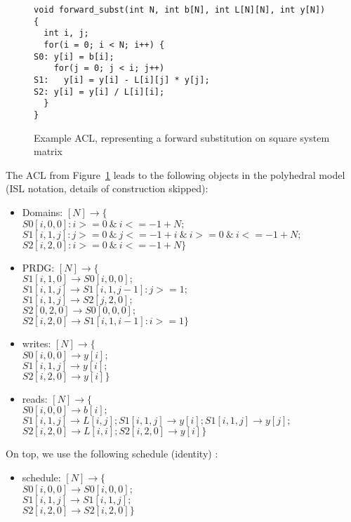 \documentclass{article}
\begin{document}
\begin{figure}[ht!]
\begin{lstlisting}
void forward_subst(int N, int b[N], int L[N][N], int y[N]) {
  int i, j;
  for(i = 0; i < N; i++) {
S0: y[i] = b[i];
    for(j = 0; j < i; j++)
S1:   y[i] = y[i] - L[i][j] * y[j];
S2: y[i] = y[i] / L[i][i];
  }
}
\end{lstlisting}
\caption{
Example ACL, representing a forward substitution on square system matrix
\label{fig:example_acl2}}
\end{figure}
The ACL from Figure~\ref{fig:example_acl2} leads to the following objects in the
polyhedral model (ISL notation, details of construction skipped):
\begin{itemize}
\item Domains: $[N] \rightarrow \{$\\ 
 $S0[i,0,0] : i >= 0 ~\&~ i <= -1 + N;$\\
 $S1[i,1,j] : j >= 0 ~\&~ j <= -1 + i ~\&~ i >=0 ~\&~ i <= -1 + N; $\\
 $S2[i,2,0] : i >= 0 ~\&~ i <= -1 + N \}$
\item PRDG: $[N] \rightarrow \{$\\
 $S1[i,1,0] \rightarrow S0[i,0,0];$\\
 $S1[i,1,j] \rightarrow S1[i,1,j-1] : j >= 1;$\\
 $S1[i,1,j] \rightarrow S2[j,2,0];$\\
 $S2[0,2,0] \rightarrow S0[0,0,0];$\\
 $S2[i,2,0] \rightarrow S1[i,1,i-1] : i >= 1 \}$
\item writes: $[N] \rightarrow \{ $\\
 $S0[i,0,0] \rightarrow y[i];$\\
 $S1[i,1,j] \rightarrow y[i];$\\
 $S2[i,2,0] \rightarrow y[i] \}$
\item reads: $[N] \rightarrow \{$\\
 $S0[i,0,0] \rightarrow b[i];$\\
 $S1[i,1,j] \rightarrow L[i, j]; S1[i,1,j] \rightarrow y[i]; S1[i,1,j] \rightarrow y[j];$\\
 $S2[i,2,0] \rightarrow L[i, i]; S2[i,2,0] \rightarrow y[i] \}$
\end{itemize}
On top, we use the following schedule (identity) :
\begin{itemize}
  \item schedule: $[N] \rightarrow \{ $\\
 $S0[i,0,0] \rightarrow S0[i,0,0];$\\
 $S1[i,1,j] \rightarrow S1[i,1,j];$\\
 $S2[i,2,0] \rightarrow S2[i,2,0] \}$
\end{itemize}
\end{document}
